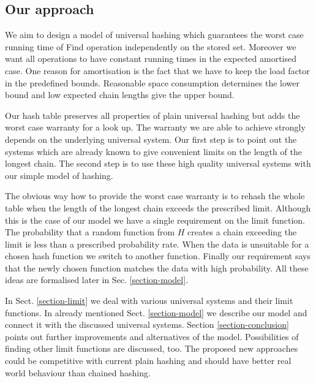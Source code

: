 \subsection{Our approach}
We aim to design a model of universal hashing which guarantees the worst case running time of Find operation independently on the stored set. Moreover we want all operations to have constant running times in the expected amortised case. One reason for amortisation is the fact that we have to keep the load factor in the predefined bounds. Reasonable space consumption determines the lower bound and low expected chain lengths give the upper bound.

Our hash table preserves all properties of plain universal hashing but adds the worst case warranty for a look up. The warranty we are able to achieve strongly depends on the underlying universal system. Our first step is to point out the systems which are already known to give convenient limits on the length of the longest chain. The second step is to use these high quality universal systems with our simple model of hashing.

The obvious way how to provide the worst case warranty is to rehash the whole table when the length of the longest chain exceeds the prescribed limit. Although this is the case of our model we have a single requirement on the limit function. The probability that a random function from $H$ creates a chain exceeding the limit is less than a prescribed probability rate. When the data is unsuitable for a chosen hash function we switch to another function. Finally our requirement says that the newly chosen function matches the data with high probability. All these ideas are formalised later in Sec. \ref{section-model}.

In Sect. \ref{section-limit} we deal with various universal systems and their limit functions. In already mentioned Sect. \ref{section-model} we describe our model and connect it with the discussed universal systems. Section \ref{section-conclusion} points out further improvements and alternatives of the model. Possibilities of finding other limit functions are discussed, too. The proposed new approaches could be competitive with current plain hashing and should have better real world behaviour than chained hashing.
